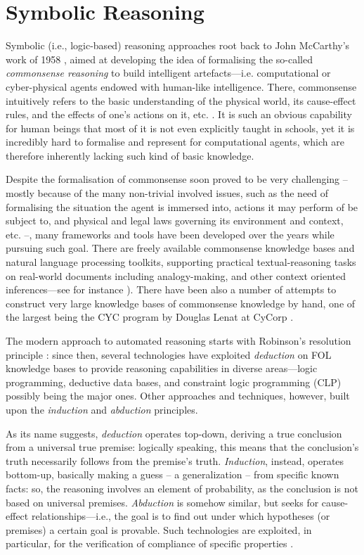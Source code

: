 \documentclass[12pt,a4paper,openright,twoside]{book}
\begin{document}
\section{Symbolic Reasoning}\label{sec:symbolic-reasoning}

Symbolic (i.e., logic-based) reasoning approaches root back to John McCarthy's work of 1958 \cite{Mccarthy1958}, aimed at developing the idea of formalising the so-called \emph{commonsense reasoning} to build intelligent artefacts---i.e. computational or cyber-physical agents endowed with human-like intelligence.
%
There, commonsense intuitively refers to the basic understanding of the physical world, its cause-effect rules, and the effects of one's actions on it, etc. \cite{Mccarthy1989}.
%
It is such an obvious capability for human beings that most of it is not even explicitly taught in schools, yet it is incredibly hard to formalise and represent for computational agents, which are therefore inherently lacking such kind of basic knowledge.

Despite the formalisation of commonsense soon proved to be very challenging -- mostly because of the many non-trivial involved issues, such as the need of formalising the situation the agent is immersed into, actions it may perform of be subject to, and physical and legal laws governing its environment and context, etc. --, many frameworks and tools have been developed over the years while pursuing such goal.
%
There are freely available commonsense knowledge bases and natural language processing toolkits, supporting practical textual-reasoning tasks on real-world documents including analogy-making, and other context oriented inferences---see for instance \cite{lieberman2004,liu2004conceptnet,liu2002goose,shapiro1999sneps}).
%
There have been also a number of attempts to construct very large knowledge bases of commonsense knowledge by hand, one of the largest being the CYC program by Douglas Lenat at CyCorp \cite{lenat1995-cyc}.

The modern approach to automated reasoning starts with Robinson's resolution principle \cite{robinson1965}: since then, several technologies have exploited \emph{deduction} on FOL knowledge bases to provide reasoning capabilities in diverse areas---logic programming, deductive data bases, and constraint logic programming (CLP) possibly being the major ones.
%
Other approaches and techniques, however, built upon the \emph{induction} and \emph{abduction} principles.

As its name suggests, \emph{deduction} operates top-down, deriving a true conclusion from a universal true premise: logically speaking, this means that the conclusion's truth necessarily follows from the premise's truth.
%
\emph{Induction}, instead, operates bottom-up, basically making a guess -- a generalization -- from specific known facts: so, the reasoning involves an element of probability, as the conclusion is not based on universal premises.
%
\emph{Abduction} is somehow similar, but seeks for cause-effect relationships---i.e., the goal is to find out under which hypotheses (or premises) a certain goal is provable.
%
Such technologies are exploited, in particular, for the verification of compliance of specific properties \cite{montali2010}.
\end{document}

